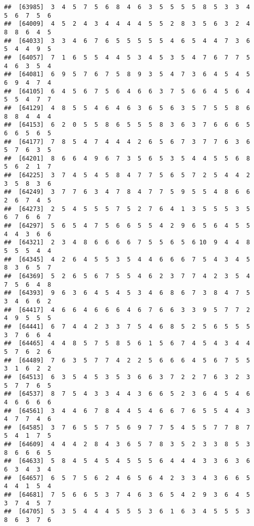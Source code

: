 \documentclass[
]{book}
\begin{document}
\begin{verbatim}
##  [63985]  3  4  5  7  5  6  8  4  6  3  5  5  5  5  8  5  3  3  4  5  6  7  5  6
##  [64009]  4  5  2  4  3  4  4  4  4  5  5  2  8  3  5  6  3  2  4  8  8  6  4  5
##  [64033]  3  3  4  6  7  6  5  5  5  5  5  4  6  5  4  4  7  3  6  5  4  4  9  5
##  [64057]  7  1  6  5  5  4  4  5  3  4  5  3  5  4  7  6  7  7  5  4  6  3  5  4
##  [64081]  6  9  5  7  6  7  5  8  9  3  5  4  7  3  6  4  5  4  5  6  9  4  7  4
##  [64105]  6  4  5  6  7  5  6  4  6  6  3  7  5  6  6  4  5  6  4  5  5  4  7  7
##  [64129]  4  8  5  5  4  6  4  6  3  6  5  6  3  5  7  5  5  8  6  8  8  4  4  4
##  [64153]  6  2  0  5  5  8  6  5  5  5  8  3  6  3  7  6  6  6  5  6  6  5  6  5
##  [64177]  7  8  5  4  7  4  4  4  2  6  5  6  7  3  7  7  6  3  6  5  7  6  3  5
##  [64201]  8  6  6  4  9  6  7  3  5  6  5  3  5  4  4  5  5  6  8  5  6  2  1  7
##  [64225]  3  7  4  5  4  5  8  4  7  7  5  6  5  7  2  5  4  4  2  3  5  8  3  6
##  [64249]  3  7  7  6  3  4  7  8  4  7  7  5  9  5  5  4  8  6  6  2  6  7  4  5
##  [64273]  2  5  4  5  5  5  7  5  2  7  6  4  1  3  5  5  5  3  5  6  7  6  6  7
##  [64297]  5  6  5  4  7  5  6  6  5  5  4  2  9  6  5  6  4  5  5  4  4  3  6  6
##  [64321]  2  3  4  8  6  6  6  6  7  5  5  6  5  6 10  9  4  4  8  5  5  5  4  4
##  [64345]  4  2  6  4  5  5  3  5  4  4  6  6  6  7  5  4  3  4  5  8  3  6  5  7
##  [64369]  5  2  6  5  6  7  5  5  4  6  2  3  7  7  4  2  3  5  4  7  5  6  4  8
##  [64393]  9  6  3  6  4  5  4  5  3  4  6  8  6  7  3  8  4  7  5  3  4  6  6  2
##  [64417]  4  6  6  4  6  6  6  4  6  7  6  6  3  3  9  5  7  7  2  4  9  5  5  5
##  [64441]  6  7  4  4  2  3  3  7  5  4  6  8  5  2  5  6  5  5  5  3  7  6  6  4
##  [64465]  4  4  8  5  7  5  8  5  6  1  5  6  7  4  5  4  3  4  4  5  7  6  2  6
##  [64489]  7  6  3  5  7  7  4  2  2  5  6  6  6  4  5  6  7  5  5  3  1  6  2  2
##  [64513]  6  3  5  4  5  3  5  3  6  6  3  7  2  2  7  6  3  2  3  5  7  7  6  5
##  [64537]  8  7  5  4  3  3  4  4  3  6  6  5  2  3  6  4  5  4  6  4  6  6  6  6
##  [64561]  3  4  4  6  7  8  4  4  5  4  6  6  7  6  5  5  4  4  3  4  7  7  4  6
##  [64585]  3  7  6  5  5  7  5  6  9  7  7  5  4  5  5  7  7  8  7  5  4  1  7  5
##  [64609]  4  4  4  2  8  4  3  6  5  7  8  3  5  2  3  3  8  5  3  8  6  6  6  5
##  [64633]  5  8  4  5  4  5  4  5  5  5  6  4  4  4  3  3  6  3  6  6  3  4  3  4
##  [64657]  6  5  7  5  6  2  4  6  5  6  4  2  3  3  4  3  6  6  5  4  4  1  5  4
##  [64681]  7  5  6  6  5  3  7  4  6  3  6  5  4  2  9  3  6  4  5  3  7  4  5  7
##  [64705]  5  3  5  4  4  4  5  5  5  3  6  1  6  3  4  5  5  5  3  8  6  3  7  6

\end{verbatim}
\end{document}
